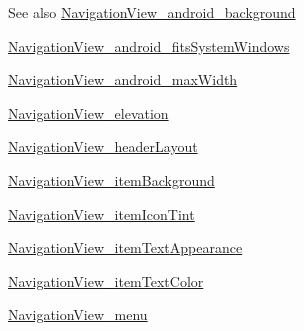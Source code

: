 \begin{DoxySeeAlso}{See also}
\hyperlink{classcheck_1_1test_1_1_r_1_1styleable_ad8bc81f909c3c15ed73a95d19448d19a}{Navigation\+View\+\_\+android\+\_\+background} 

\hyperlink{classcheck_1_1test_1_1_r_1_1styleable_a69ae6facbf34d06b9f470f7471dfff79}{Navigation\+View\+\_\+android\+\_\+fits\+System\+Windows} 

\hyperlink{classcheck_1_1test_1_1_r_1_1styleable_a14840a3ae29e9331de83b023e02fa994}{Navigation\+View\+\_\+android\+\_\+max\+Width} 

\hyperlink{classcheck_1_1test_1_1_r_1_1styleable_a88ddf97958b48ba8933c1d24db5015fa}{Navigation\+View\+\_\+elevation} 

\hyperlink{classcheck_1_1test_1_1_r_1_1styleable_ab9421b2c3084fab03258249932b7e0fd}{Navigation\+View\+\_\+header\+Layout} 

\hyperlink{classcheck_1_1test_1_1_r_1_1styleable_a6f64b2a76b94c56288e3b8818af36228}{Navigation\+View\+\_\+item\+Background} 

\hyperlink{classcheck_1_1test_1_1_r_1_1styleable_ae351f9847230f9848b52f060c63c4bdd}{Navigation\+View\+\_\+item\+Icon\+Tint} 

\hyperlink{classcheck_1_1test_1_1_r_1_1styleable_ad7564a8ef74749a8d3928c139af4eaa6}{Navigation\+View\+\_\+item\+Text\+Appearance} 

\hyperlink{classcheck_1_1test_1_1_r_1_1styleable_aee02dda2f676d8cbb891a1e27e386d49}{Navigation\+View\+\_\+item\+Text\+Color} 

\hyperlink{classcheck_1_1test_1_1_r_1_1styleable_a96d0c1fc480a50b365523e0530106f73}{Navigation\+View\+\_\+menu} 
\end{DoxySeeAlso}
\hypertarget{classcheck_1_1test_1_1_r_1_1styleable_ad8bc81f909c3c15ed73a95d19448d19a}{}
